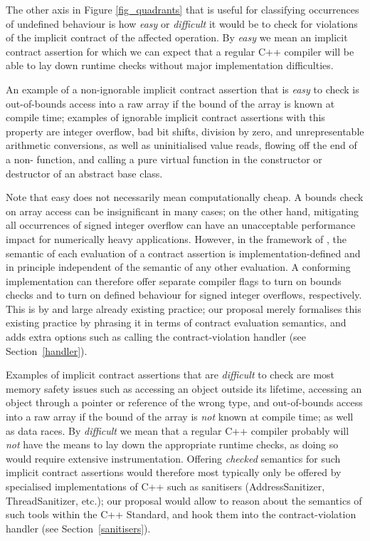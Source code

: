 The other axis in Figure \ref{fig_quadrants} that is useful for classifying occurrences of undefined behaviour is how \emph{easy} or \emph{difficult} it would be to check for violations of the implicit contract of the affected operation. By \emph{easy} we mean an implicit contract assertion for which we can expect that a regular C++ compiler will be able to lay down runtime checks without major implementation difficulties.

An example of a non-ignorable implicit contract assertion that is \emph{easy} to check is out-of-bounds access into a raw array if the bound of the array is known at compile time; examples of ignorable implicit contract assertions with this property are integer overflow, bad bit shifts, division by zero, and unrepresentable arithmetic conversions, as well as uninitialised value reads, flowing off the end of a non- function, and calling a pure virtual function in the constructor or destructor of an abstract base class.

Note that easy does not necessarily mean computationally cheap. A bounds check on array access can be insignificant in many cases; on the other hand, mitigating all occurrences of signed integer overflow can have an unacceptable performance impact for numerically heavy applications. However, in the framework of \cite{P2900R8}, the semantic of each evaluation of a contract assertion is implementation-defined and in principle independent of the semantic of any other evaluation. A conforming implementation can therefore offer separate compiler flags to turn on bounds checks and to turn on defined behaviour for signed integer overflows, respectively. This is by and large already existing practice; our proposal merely formalises this existing practice by phrasing it in terms of contract evaluation semantics, and adds extra options such as calling the contract-violation handler (see Section~\ref{handler}).

Examples of implicit contract assertions that are \emph{difficult} to check are most memory safety issues such as accessing an object outside its lifetime, accessing an object through a pointer or reference of the wrong type, and out-of-bounds access into a raw array if the bound of the array is \emph{not} known at compile time; as well as data races. By \emph{difficult} we mean that a regular C++ compiler probably will \emph{not} have the means to lay down the appropriate runtime checks, as doing so would require extensive instrumentation. Offering \emph{checked} semantics for such implicit contract assertions would therefore most typically only be offered by specialised implementations of C++ such as sanitisers (AddressSanitizer, ThreadSanitizer, etc.); our proposal would allow to reason about the semantics of such tools within the C++ Standard, and hook them into the contract-violation handler (see Section~\ref{sanitisers}).

